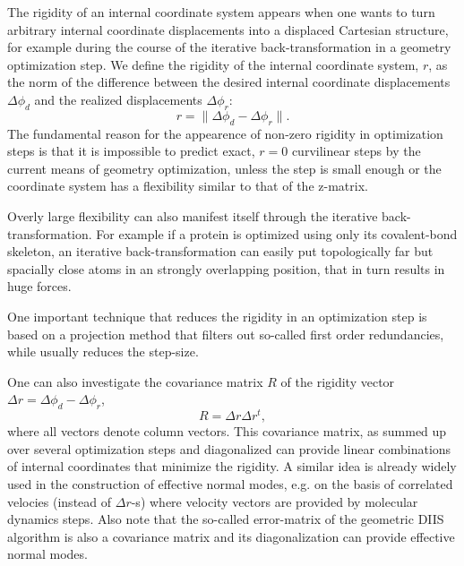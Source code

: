 \documentclass[prl,aps,preprint,superbib,12pt]{revtex4}
\begin{document}
The rigidity of an internal coordinate system appears when
one wants to turn arbitrary internal coordinate displacements
into a displaced Cartesian structure, for example
during the course of the iterative back-transformation 
\cite{PPulay77} in a geometry optimization step. 
We define the rigidity of the internal coordinate system, $r$, 
as the norm of the difference between the desired internal coordinate 
displacements $\Delta \phi_{d}$ 
and the realized displacements $\Delta \phi_{r}$: 
\begin{equation}
r = \| \Delta \phi_{d} - \Delta \phi_{r} \| .
\end{equation}
The fundamental reason for the appearence of non-zero
rigidity in optimization steps is 
that it is impossible to predict exact, $r=0$ curvilinear
steps by the current means of geometry optimization, unless
the step is small enough or the coordinate system has a flexibility 
similar to that of the z-matrix.

Overly large flexibility can also manifest itself through the iterative
back-transformation. For example if a protein is optimized
using only its covalent-bond skeleton, an iterative 
back-transformation can easily put
topologically far but spacially close atoms in an strongly 
overlapping position, that in turn results in huge forces.



One important technique 
that reduces the rigidity in an optimization step
is based on a projection method \cite{PPulay92} that filters out
so-called first order redundancies, while usually reduces 
the step-size.

One can also investigate the covariance matrix $R$
of the rigidity vector $\Delta r = \Delta \phi_{d} - \Delta \phi_{r}$,
\begin{equation}
R = \Delta r \Delta r^{t} ,
\end{equation}
where all vectors denote column vectors. This covariance matrix,
as summed up over several optimization steps and diagonalized 
can provide linear
combinations of internal coordinates that minimize the rigidity.
A similar idea \cite{MKarplus81,AStrachan04} 
is already widely used in the construction of 
effective normal modes, e.g. on the basis of correlated velocies
(instead of $\Delta r$-s) where velocity vectors
are provided by molecular dynamics steps. Also note that the so-called
error-matrix of the geometric DIIS algorithm \cite{PPulay84} is also a
covariance matrix and its diagonalization can provide effective
normal modes.
\end{document}
